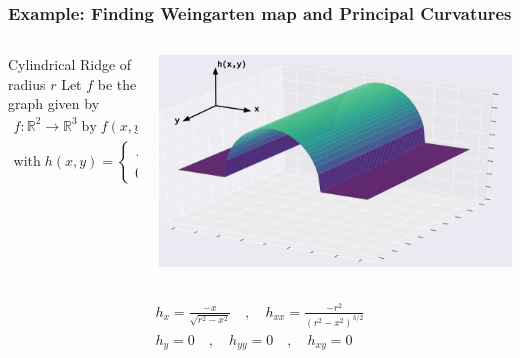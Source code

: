 \documentclass[9pt]{beamer}
\newcommand{\R}{\mathbb{R}} %
\begin{document}
\begin{frame}
  \frametitle{Example: Finding Weingarten map and Principal Curvatures}

\begin{columns}
  \begin{column}{0.5\textwidth}
    \begin{block}{Cylindrical Ridge of radius $r$}
    Let $f$ be the graph given by 
    \begin{gather*}
    f: \R^2 \to \R^3 \;\textrm{by}\; f(x,y) = (x,y,h(x,y)), \\
    \textrm{with}\;
    h(x,y) = \begin{cases}
    \sqrt{r^2 - x^2} & -r < x < r \\
    0 & \textrm{else}
    \end{cases}
    \end{gather*}
  \end{block}
  \end{column}

\begin{column}{0.5\textwidth}
  \includegraphics[width=\linewidth]{circular_trough_with_axes}
\end{column}
\end{columns}


\begin{gather*}
h_x = \frac{-x}{\sqrt{r^2 - x^2}}
\quad , \quad
h_{xx} = \frac{-r^2}{\left(r^2 - x^2\right)^{3/2}}\\
h_y = 0
\quad , \quad
h_{yy} = 0 \quad,\quad h_{xy} = 0
\end{gather*}
\end{frame}
\end{document}
